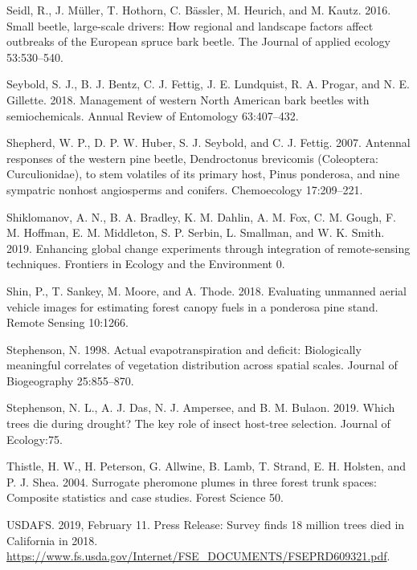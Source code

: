 \documentclass[]{article}
\begin{document}
\leavevmode\hypertarget{ref-seidl2016a}{}%
Seidl, R., J. Müller, T. Hothorn, C. Bässler, M. Heurich, and M. Kautz.
2016. Small beetle, large-scale drivers: How regional and landscape
factors affect outbreaks of the European spruce bark beetle. The Journal
of applied ecology 53:530--540.

\leavevmode\hypertarget{ref-seybold2018}{}%
Seybold, S. J., B. J. Bentz, C. J. Fettig, J. E. Lundquist, R. A.
Progar, and N. E. Gillette. 2018. Management of western North American
bark beetles with semiochemicals. Annual Review of Entomology
63:407--432.

\leavevmode\hypertarget{ref-shepherd2007}{}%
Shepherd, W. P., D. P. W. Huber, S. J. Seybold, and C. J. Fettig. 2007.
Antennal responses of the western pine beetle, Dendroctonus brevicomis
(Coleoptera: Curculionidae), to stem volatiles of its primary host,
Pinus ponderosa, and nine sympatric nonhost angiosperms and conifers.
Chemoecology 17:209--221.

\leavevmode\hypertarget{ref-shiklomanov2019}{}%
Shiklomanov, A. N., B. A. Bradley, K. M. Dahlin, A. M. Fox, C. M. Gough,
F. M. Hoffman, E. M. Middleton, S. P. Serbin, L. Smallman, and W. K.
Smith. 2019. Enhancing global change experiments through integration of
remote-sensing techniques. Frontiers in Ecology and the Environment 0.

\leavevmode\hypertarget{ref-shin2018}{}%
Shin, P., T. Sankey, M. Moore, and A. Thode. 2018. Evaluating unmanned
aerial vehicle images for estimating forest canopy fuels in a ponderosa
pine stand. Remote Sensing 10:1266.

\leavevmode\hypertarget{ref-stephenson1998}{}%
Stephenson, N. 1998. Actual evapotranspiration and deficit: Biologically
meaningful correlates of vegetation distribution across spatial scales.
Journal of Biogeography 25:855--870.

\leavevmode\hypertarget{ref-stephenson2019}{}%
Stephenson, N. L., A. J. Das, N. J. Ampersee, and B. M. Bulaon. 2019.
Which trees die during drought? The key role of insect host-tree
selection. Journal of Ecology:75.

\leavevmode\hypertarget{ref-thistle2004}{}%
Thistle, H. W., H. Peterson, G. Allwine, B. Lamb, T. Strand, E. H.
Holsten, and P. J. Shea. 2004. Surrogate pheromone plumes in three
forest trunk spaces: Composite statistics and case studies. Forest
Science 50.

\leavevmode\hypertarget{ref-usdafs2019}{}%
USDAFS. 2019, February 11. Press Release: Survey finds 18 million trees
died in California in 2018.
\url{https://www.fs.usda.gov/Internet/FSE_DOCUMENTS/FSEPRD609321.pdf}.
\end{document}

